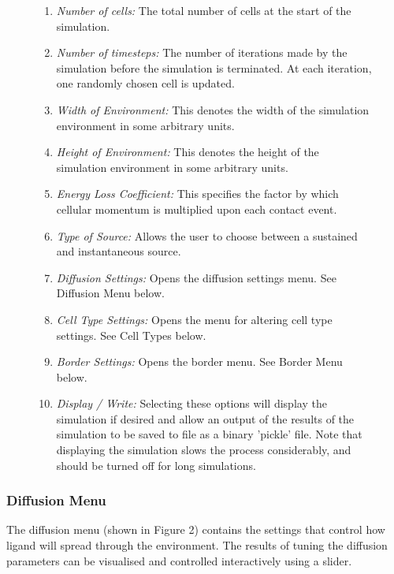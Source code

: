 \documentclass[12pt]{article}
\begin{document}
\begin{figure}[H]
{\begin{enumerate}[topsep=2pt,itemsep=-1ex,partopsep=1ex,parsep=1ex]
\item {\itshape Number of cells:} The total number of cells at the start 
of the simulation.
\item {\itshape Number of timesteps:} The number of iterations made by 
the simulation before the simulation is terminated. At each iteration, 
one randomly chosen cell is updated.
\item {\itshape Width of Environment:} This denotes the width of the 
simulation environment in some arbitrary units.
\item {\itshape Height of Environment:} This denotes the height of the 
simulation environment in some arbitrary units.
\item {\itshape Energy Loss Coefficient:} This specifies the factor by 
which cellular momentum is multiplied upon each contact event.
\item {\itshape Type of Source:} Allows the user to choose between 
a sustained and instantaneous source.
\item {\itshape Diffusion Settings:} Opens the diffusion settings menu. See Diffusion Menu below.
\item {\itshape Cell Type Settings:} Opens the menu for altering cell 
type settings. See Cell Types below.
\item {\itshape Border Settings:} Opens the border menu. See Border Menu below.
\item {\itshape Display / Write:} Selecting these options will display 
the simulation if desired and allow an output of the results of the 
simulation to be saved to file as a binary 'pickle' file. Note that 
displaying the simulation slows the process considerably, and should be 
turned off for long simulations.
\end{enumerate}
}
\end{figure}

\subsubsection{Diffusion Menu}
The diffusion menu (shown in Figure 2) contains the settings that control how 
ligand will spread through the environment. The results of 
tuning the diffusion parameters can be visualised and controlled 
interactively using a slider.
\end{document}
